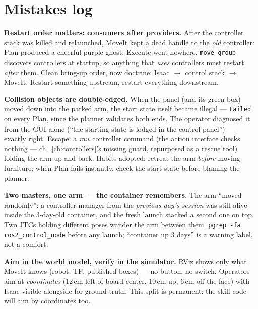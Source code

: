 \section{Mistakes log}

\begin{lesson}
\textbf{Restart order matters: consumers after providers.} After the controller stack was
killed and relaunched, MoveIt kept a dead handle to the \emph{old} controller: Plan produced a
cheerful purple ghost; Execute went nowhere. \texttt{move\_group} discovers controllers at
startup, so anything that \emph{uses} controllers must restart \emph{after} them. Clean
bring-up order, now doctrine: Isaac $\to$ control stack $\to$ MoveIt. Restart something
upstream, restart everything downstream.
\end{lesson}

\begin{lesson}
\textbf{Collision objects are double-edged.} When the panel (and its green box) moved down into
the parked arm, the start state itself became illegal --- \texttt{Failed} on every Plan, since
the planner validates both ends. The operator diagnosed it from the GUI alone (``the starting
state is lodged in the control panel'') --- exactly right. Escape: a \emph{raw} controller
command (the action interface checks nothing --- ch.~\ref{ch:controllers}'s missing guard,
repurposed as a rescue tool) folding the arm up and back. Habits adopted: retreat the arm
\emph{before} moving furniture; when Plan fails instantly, check the start state before blaming
the planner.
\end{lesson}

\begin{lesson}
\textbf{Two masters, one arm --- the container remembers.} The arm ``moved randomly'': a
controller manager from the \emph{previous day's session} was still alive inside the 3-day-old
container, and the fresh launch stacked a second one on top. Two JTCs holding different poses
wander the arm between them. \texttt{pgrep -fa ros2\_control\_node} before any launch;
``container up 3 days'' is a warning label, not a comfort.
\end{lesson}

\begin{lesson}
\textbf{Aim in the world model, verify in the simulator.} RViz shows only what MoveIt knows
(robot, TF, published boxes) --- no button, no switch. Operators aim at \emph{coordinates}
(12\,cm left of board center, 10\,cm up, 6\,cm off the face) with Isaac visible alongside for
ground truth. This split is permanent: the skill code will aim by coordinates too.
\end{lesson}

